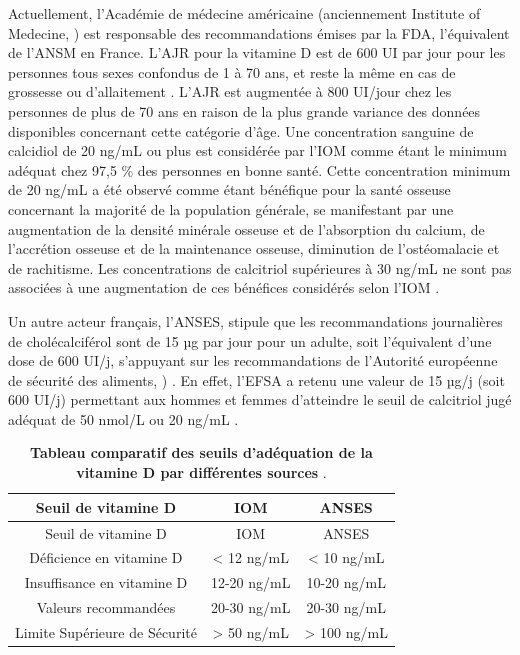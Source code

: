 \documentclass[
  a4paper,
  DIV=11,
  numbers=noendperiod,
  listof=totoc]{scrreprt}
\begin{document}
Actuellement, l'Académie de médecine américaine (anciennement Institute
of Medecine, ) est responsable des recommandations émises par
la \ac{FDA}, l'équivalent de l'\ac{ANSM} en France. L'\ac{AJR} pour la
vitamine D est de 600 UI par jour pour les personnes tous sexes
confondus de 1 à 70 ans, et reste la même en cas de grossesse ou
d'allaitement \autocite{IOM.2011}. L'\ac{AJR} est augmentée à 800
UI/jour chez les personnes de plus de 70 ans en raison de la plus grande
variance des données disponibles concernant cette catégorie d'âge. Une
concentration sanguine de calcidiol de 20 ng/mL ou plus est considérée
par l'\ac{IOM} comme étant le minimum adéquat chez 97,5 \% des personnes
en bonne santé. Cette concentration minimum de 20 ng/mL a été observé
comme étant bénéfique pour la santé osseuse concernant la majorité de la
population générale, se manifestant par une augmentation de la densité
minérale osseuse et de l'absorption du calcium, de l'accrétion osseuse
et de la maintenance osseuse, diminution de l'ostéomalacie et de
rachitisme. Les concentrations de calcitriol supérieures à 30 ng/mL ne
sont pas associées à une augmentation de ces bénéfices considérés selon
l'\ac{IOM} \autocite{IOM.2011,Rosen.2012}.

Un autre acteur français, l'\ac{ANSES}, stipule que les recommandations
journalières de cholécalciférol sont de 15 µg par jour pour un adulte,
soit l'équivalent d'une dose de 600 UI/j, s'appuyant sur les
recommandations de l'Autorité européenne de sécurité des aliments,
) \autocite{ANSES.2021}. En effet, l'\ac{EFSA} a retenu une
valeur de 15 µg/j (soit 600 UI/j) permettant aux hommes et femmes
d'atteindre le seuil de calcitriol jugé adéquat de 50 nmol/L ou 20 ng/mL
\autocite{ANSES.2022}.

\hypertarget{tbl-seuil}{}
\begin{longtable}[]{@{}ccc@{}}
\caption{\label{tbl-seuil}\textbf{Tableau comparatif des seuils
d'adéquation de la vitamine D par différentes sources}
\autocite{IOM.2011,ANSES.2021}.}\tabularnewline
\toprule\noalign{}
Seuil de vitamine D & IOM & ANSES \\
\midrule\noalign{}
\endfirsthead
\toprule\noalign{}
Seuil de vitamine D & IOM & ANSES \\
\midrule\noalign{}
\endhead
\bottomrule\noalign{}
\endlastfoot
Déficience en vitamine D & \textless{} 12 ng/mL & \textless{} 10
ng/mL \\
Insuffisance en vitamine D & 12-20 ng/mL & 10-20 ng/mL \\
Valeurs recommandées & 20-30 ng/mL & 20-30 ng/mL \\
Limite Supérieure de Sécurité & \textgreater{} 50 ng/mL & \textgreater{}
100 ng/mL \\
\end{longtable}
\end{document}
